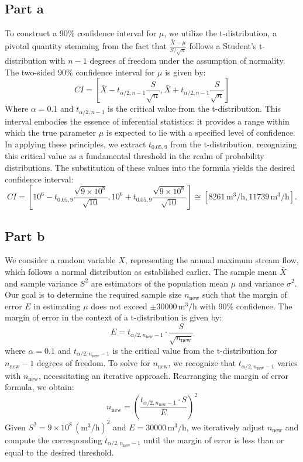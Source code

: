 \documentclass[12pt]{article}
\begin{document}
\subsection*{Part a}
To construct a 90\% confidence interval for \( \mu \), we utilize the t-distribution, a pivotal quantity stemming from the fact that \( \frac{\bar{X} - \mu}{S/\sqrt{n}} \) follows a Student's t-distribution with \( n-1 \) degrees of freedom under the assumption of normality. The two-sided 90\% confidence interval for \( \mu \) is given by: \[ CI = \left[ \bar{X} - t_{\alpha/2, n-1} \frac{S}{\sqrt{n}}, \bar{X} + t_{\alpha/2, n-1} \frac{S}{\sqrt{n}} \right] \] Where \( \alpha = 0.1 \) and \( t_{\alpha/2, n-1} \) is the critical value from the t-distribution. This interval embodies the essence of inferential statistics: it provides a range within which the true parameter \( \mu \) is expected to lie with a specified level of confidence. In applying these principles, we extract \( t_{0.05, 9} \) from the t-distribution, recognizing this critical value as a fundamental threshold in the realm of probability distributions. The substitution of these values into the formula yields the desired confidence interval: \[ CI = \left[ 10^6 - t_{0.05, 9} \frac{\sqrt{9 \times 10^8}}{\sqrt{10}}, 10^6 + t_{0.05, 9} \frac{\sqrt{9 \times 10^8}}{\sqrt{10}} \right] \cong \left[8261 \, \text{m}^3/\text{h}, 11739 \, \text{m}^3/\text{h}\right].\]
\AnswerTag






\subsection*{Part b}
We consider a random variable \( X \), representing the annual maximum stream flow, which follows a normal distribution as established earlier. The sample mean \( \bar{X} \) and sample variance \( S^2 \) are estimators of the population mean \( \mu \) and variance \( \sigma^2 \). Our goal is to determine the required sample size \( n_{\text{new}} \) such that the margin of error \( E \) in estimating \( \mu \) does not exceed \( \pm 30000 \, \text{m}^3/\text{h} \) with 90\% confidence. The margin of error in the context of a t-distribution is given by: \[ E = t_{\alpha/2, n_{\text{new}}-1} \cdot \frac{S}{\sqrt{n_{\text{new}}}} \] where \( \alpha = 0.1 \) and \( t_{\alpha/2, n_{\text{new}}-1} \) is the critical value from the t-distribution for \( n_{\text{new}}-1 \) degrees of freedom. To solve for \( n_{\text{new}} \), we recognize that \( t_{\alpha/2, n_{\text{new}}-1} \) varies with \( n_{\text{new}} \), necessitating an iterative approach. Rearranging the margin of error formula, we obtain: \[ n_{\text{new}} = \left( \frac{t_{\alpha/2, n_{\text{new}}-1} \cdot S}{E} \right)^2 \] Given \( S^2 = 9 \times 10^8 \, (\text{m}^3/\text{h})^2 \) and \( E = 30000 \, \text{m}^3/\text{h} \), we iteratively adjust \( n_{\text{new}} \) and compute the corresponding \( t_{\alpha/2, n_{\text{new}}-1} \) until the margin of error is less than or equal to the desired threshold.
\end{document}
